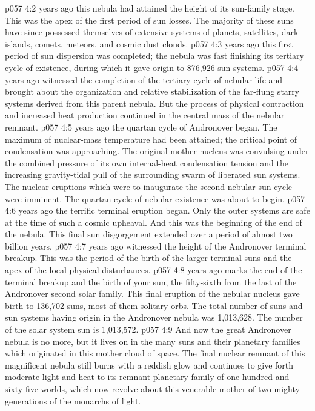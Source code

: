 \pc \vs p057 4:2  years ago this nebula had attained the height of its sun\hyp{}family stage. This was the apex of the first period of sun losses. The majority of these suns have since possessed themselves of extensive systems of planets, satellites, dark islands, comets, meteors, and cosmic dust clouds.
\pc \vs p057 4:3  years ago this first period of sun dispersion was completed; the nebula was fast finishing its tertiary cycle of existence, during which it gave origin to 876,926 sun systems.
\pc \vs p057 4:4  years ago witnessed the completion of the tertiary cycle of nebular life and brought about the organization and relative stabilization of the far\hyp{}flung starry systems derived from this parent nebula. But the process of physical contraction and increased heat production continued in the central mass of the nebular remnant.
\pc \vs p057 4:5  years ago the quartan cycle of Andronover began. The maximum of nuclear\hyp{}mass temperature had been attained; the critical point of condensation was approaching. The original mother nucleus was convulsing under the combined pressure of its own internal\hyp{}heat condensation tension and the increasing gravity\hyp{}tidal pull of the surrounding swarm of liberated sun systems. The nuclear eruptions which were to inaugurate the second nebular sun cycle were imminent. The quartan cycle of nebular existence was about to begin.
\pc \vs p057 4:6  years ago the terrific terminal eruption began. Only the outer systems are safe at the time of such a cosmic upheaval. And this was the beginning of the end of the nebula. This final sun disgorgement extended over a period of almost two billion years.
\pc \vs p057 4:7  years ago witnessed the height of the Andronover terminal breakup. This was the period of the birth of the larger terminal suns and the apex of the local physical disturbances.
\pc \vs p057 4:8  years ago marks the end of the terminal breakup and the birth of your sun, the fifty\hyp{}sixth from the last of the Andronover second solar family. This final eruption of the nebular nucleus gave birth to 136,702 suns, most of them solitary orbs. The total number of suns and sun systems having origin in the Andronover nebula was 1,013,628. The number of the solar system sun is 1,013,572.
\vs p057 4:9 And now the great Andronover nebula is no more, but it lives on in the many suns and their planetary families which originated in this mother cloud of space. The final nuclear remnant of this magnificent nebula still burns with a reddish glow and continues to give forth moderate light and heat to its remnant planetary family of one hundred and sixty\hyp{}five worlds, which now revolve about this venerable mother of two mighty generations of the monarchs of light.\plusone
